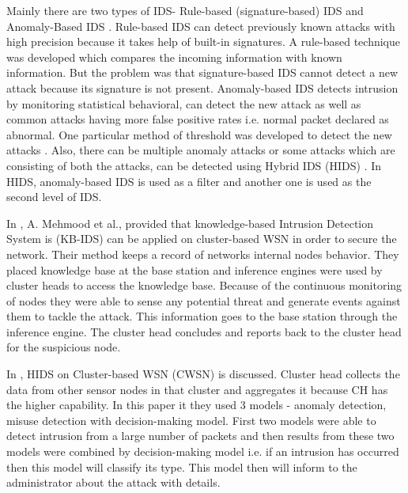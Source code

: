\noindent
Mainly there are two types of IDS- Rule-based (signature-based) IDS and Anomaly-Based IDS \cite{khan2010framework}. Rule-based IDS can detect previously known attacks with high precision because it takes help of built-in signatures. A rule-based technique was developed \cite{jha2002building} which compares the incoming information with known information. But the problem was that signature-based IDS cannot detect a new attack because its signature is not present. Anomaly-based IDS detects intrusion by monitoring statistical behavioral, can detect the new attack as well as common attacks having more false positive rates i.e. normal packet declared as abnormal. One particular method of threshold was developed to detect the new attacks \cite{xie2011anomaly}. Also, there can be multiple anomaly attacks or some attacks which are consisting of both the attacks, can be detected using Hybrid IDS (HIDS) \cite{sedjelmaci2011novel}. In HIDS, anomaly-based IDS is used as a filter and another one is used as the second level of IDS.
\par
In \cite{mehmood2018secure}, A. Mehmood et al., provided that knowledge-based Intrusion Detection System is (KB-IDS) can be applied on cluster-based WSN in order to secure the network. Their method keeps a record of networks internal nodes behavior. They placed knowledge base at the base station and inference engines were used by cluster heads to access the knowledge base. Because of the continuous monitoring of nodes they were able to sense any potential threat and generate events against them to tackle the attack. This information goes to the base station through the inference engine. The cluster head concludes and reports back to the cluster head for the suspicious node.
\par
In \cite{yan2009hybrid}, HIDS on Cluster-based WSN (CWSN) is discussed. Cluster head collects the data from other sensor nodes in that cluster and aggregates it because CH has the higher capability. In this paper it they used 3 models - anomaly detection, misuse detection with decision-making model. First two models were able to detect intrusion from a large number of packets and then results from these two models were combined by decision-making model i.e. if an intrusion has occurred then this model will classify its type. This model then will inform to the administrator about the attack with details.
